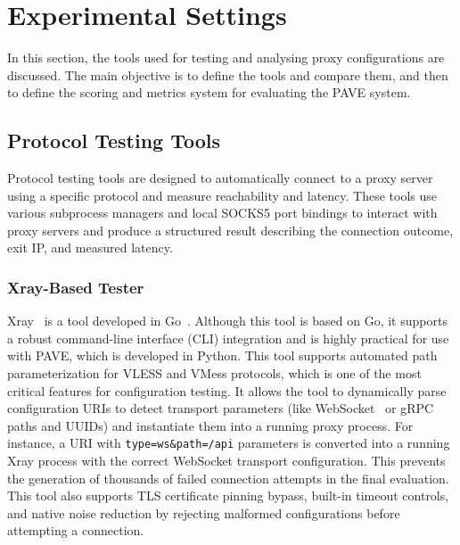 \documentclass[10pt,conference]{IEEEtran}
\begin{document}
\section{Experimental Settings}
In this section, the tools used for testing and analysing proxy configurations are discussed.
The main objective is to define the tools and compare them, and then to define the scoring and metrics system for evaluating the PAVE system.

\subsection{Protocol Testing Tools}
Protocol testing tools are designed to automatically connect to a proxy server using a specific protocol and measure reachability and latency.
These tools use various subprocess managers and local SOCKS5 port bindings to interact with proxy servers and produce a structured result describing the connection outcome, exit IP, and measured latency.

\subsubsection{Xray-Based Tester}
Xray~\cite{xray_core} is a tool developed in Go~\cite{golang}.
Although this tool is based on Go, it supports a robust command-line interface (CLI) integration and is highly practical for use with PAVE, which is developed in Python.
This tool supports automated path parameterization for VLESS and VMess protocols, which is one of the most critical features for configuration testing.
It allows the tool to dynamically parse configuration URIs to detect transport parameters (like WebSocket~\cite{rfc6455} or gRPC~\cite{grpc} paths and UUIDs) and instantiate them into a running proxy process.
For instance, a URI with \texttt{type=ws\&path=/api} parameters is converted into a running Xray process with the correct WebSocket transport configuration.
This prevents the generation of thousands of failed connection attempts in the final evaluation.
This tool also supports TLS certificate pinning bypass, built-in timeout controls, and native noise reduction by rejecting malformed configurations before attempting a connection.
\end{document}
